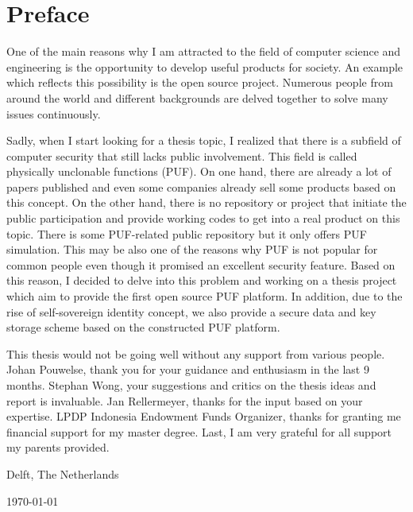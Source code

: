 \chapter*{Preface}
One of the main reasons why I am attracted to the field of computer science and engineering is the opportunity to develop useful products for society. An example which reflects this possibility is the open source project. Numerous people from around the world and different backgrounds are delved together to solve many issues continuously.

Sadly, when I start looking for a thesis topic, I realized that there is a subfield of computer security that still lacks public involvement. This field is called physically unclonable functions (PUF). On one hand, there are already a lot of papers published and even some companies already sell some products based on this concept. On the other hand, there is no repository or project that initiate the public participation and provide working codes to get into a real product on this topic. There is some PUF-related public repository but it only offers PUF simulation. This may be also one of the reasons why PUF is not popular for common people even though it promised an excellent security feature. Based on this reason, I decided to delve into this problem and working on a thesis project which aim to provide the first open source PUF platform. In addition, due to the rise of self-sovereign identity concept, we also provide a secure data and key storage scheme based on the constructed PUF platform.
\vspace{1\baselineskip}

\noindent
This thesis would not be going well without any support from various people. Johan Pouwelse, thank you for your guidance and enthusiasm in the last 9 months. Stephan Wong, your suggestions and critics on the thesis ideas and report is invaluable. Jan Rellermeyer, thanks for the input based on your expertise. LPDP Indonesia Endowment Funds Organizer, thanks for granting me financial support for my master degree. Last, I am very grateful for all support my parents provided.

\vspace{1\baselineskip}

\noindent
\reportAuthor

\vspace{1\baselineskip}

\noindent
Delft, The Netherlands

\noindent
\today
